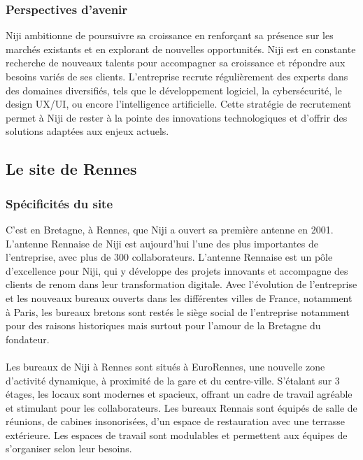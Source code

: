 \documentclass[12pt]{article}
\begin{document}
\subsubsection{Perspectives d'avenir}

Niji ambitionne de poursuivre sa croissance en renforçant sa présence sur les marchés existants et en explorant de nouvelles opportunités.
Niji est en constante recherche de nouveaux talents pour accompagner sa croissance et répondre aux besoins variés de ses clients. L'entreprise recrute régulièrement des experts dans des domaines diversifiés, tels que le développement logiciel, la cybersécurité, le design UX/UI, ou encore l'intelligence artificielle. Cette stratégie de recrutement permet à Niji de rester à la pointe des innovations technologiques et d'offrir des solutions adaptées aux enjeux actuels.
\subsection{Le site de Rennes}
\subsubsection{Spécificités du site}
C'est en Bretagne, à Rennes, que Niji a ouvert sa première antenne en 2001. L'antenne Rennaise de Niji est aujourd'hui l'une des plus importantes de l'entreprise, avec plus de 300 collaborateurs. L'antenne Rennaise est un pôle d'excellence pour Niji, qui y développe des projets innovants et accompagne des clients de renom dans leur transformation digitale. Avec l'évolution de l'entreprise et les nouveaux bureaux ouverts dans les différentes villes de France, notamment à Paris, les bureaux bretons sont restés le siège social de l'entreprise notamment pour des raisons historiques mais surtout pour l'amour de la Bretagne du fondateur.
\\\\
Les bureaux de Niji à Rennes sont situés à EuroRennes, une nouvelle zone d'activité dynamique, à proximité de la gare et du centre-ville. S'étalant sur 3 étages, les locaux sont modernes et spacieux, offrant un cadre de travail agréable et stimulant pour les collaborateurs. Les bureaux Rennais sont équipés de salle de réunions, de cabines insonorisées, d'un espace de restauration avec une terrasse extérieure. Les espaces de travail sont modulables et permettent aux équipes de s'organiser selon leur besoins. 
\end{document}
